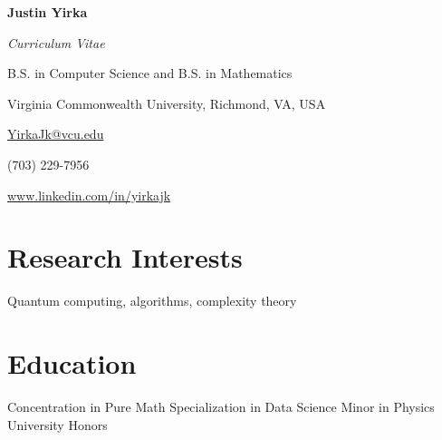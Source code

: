 \documentclass[11pt,letterpaper,serif]{moderncv}
\begin{document}
	
\thispagestyle{firstpage}

\begin{center}
	{\Large\textbf{Justin Yirka}}
	
	\textit{Curriculum Vitae}
	
	B.S. in Computer Science and B.S. in Mathematics
	
	Virginia Commonwealth University, Richmond, VA, USA
	\vspace{\baselineskip}
	
	\href{mailto:yirkajk@vcu.edu}{YirkaJk@vcu.edu}
	
	(703) 229-7956
	
	\url{www.linkedin.com/in/yirkajk}	
\end{center}


\setlength{\parskip}{0.5em}
\setlength\bibitemsep{\parskip}


\section{Research Interests}
Quantum computing, algorithms, complexity theory


\section{Education}
\vspace{-\baselineskip}\vspace{-\parskip}
{	
	\begin{adjustwidth}{.25in}{}
		Concentration in Pure Math \newline 
		Specialization in Data Science \newline
		Minor in Physics \newline
		University Honors
	\end{adjustwidth}
}
\end{document}
